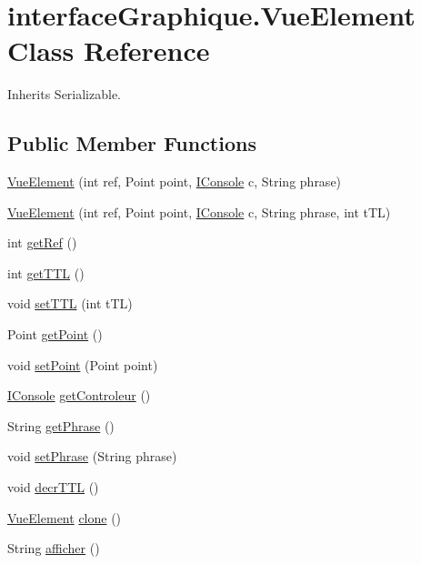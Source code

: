 \hypertarget{classinterface_graphique_1_1_vue_element}{\section{interface\-Graphique.\-Vue\-Element Class Reference}
\label{classinterface_graphique_1_1_vue_element}
}


Inherits Serializable.

\subsection*{Public Member Functions}
\begin{DoxyCompactItemize}
\item 
\hyperlink{classinterface_graphique_1_1_vue_element_ab8ebbd59c0c8dc5af23948aab5b95647}{Vue\-Element} (int ref, Point point, \hyperlink{interfacecontrole_1_1_i_console}{I\-Console} c, String phrase)
\item 
\hyperlink{classinterface_graphique_1_1_vue_element_a3da689d3d800924840f46b6444e5231d}{Vue\-Element} (int ref, Point point, \hyperlink{interfacecontrole_1_1_i_console}{I\-Console} c, String phrase, int t\-T\-L)
\item 
int \hyperlink{classinterface_graphique_1_1_vue_element_a9b8fbacb64fa2ce63df3ec91da2cd527}{get\-Ref} ()
\item 
int \hyperlink{classinterface_graphique_1_1_vue_element_ae212ad54e7caea58899a8516900a8907}{get\-T\-T\-L} ()
\item 
void \hyperlink{classinterface_graphique_1_1_vue_element_a4839fb0147cff7d3375529a62b48c285}{set\-T\-T\-L} (int t\-T\-L)
\item 
Point \hyperlink{classinterface_graphique_1_1_vue_element_ac6c5de4240dcf3639b4c8d9f1c1b153e}{get\-Point} ()
\item 
void \hyperlink{classinterface_graphique_1_1_vue_element_a089d06e5795e0848f91946a88295013f}{set\-Point} (Point point)
\item 
\hyperlink{interfacecontrole_1_1_i_console}{I\-Console} \hyperlink{classinterface_graphique_1_1_vue_element_ae8834f1bd7fc6f90809a69accb54e011}{get\-Controleur} ()
\item 
String \hyperlink{classinterface_graphique_1_1_vue_element_a7fa311f60d824a0c3af6d9e8331b601e}{get\-Phrase} ()
\item 
void \hyperlink{classinterface_graphique_1_1_vue_element_a3041521b6281d34a24e21aa9682a77db}{set\-Phrase} (String phrase)
\item 
void \hyperlink{classinterface_graphique_1_1_vue_element_a5857a4c3562d923e0bb1b86b5d1d72fd}{decr\-T\-T\-L} ()
\item 
\hyperlink{classinterface_graphique_1_1_vue_element}{Vue\-Element} \hyperlink{classinterface_graphique_1_1_vue_element_a965cb6812d04c2b5b0eaaeab458bc217}{clone} ()
\item 
String \hyperlink{classinterface_graphique_1_1_vue_element_a1bd00750328ef1d788b982597b929fb8}{afficher} ()
\end{DoxyCompactItemize}


